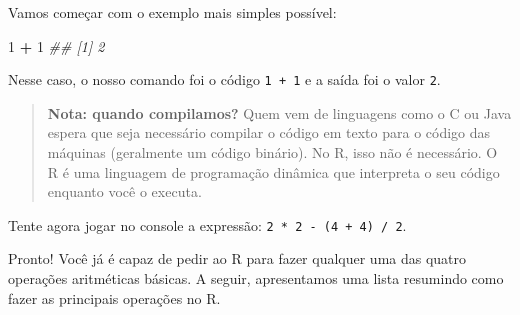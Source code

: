 \documentclass[]{book}
\newenvironment{Shaded}{\begin{snugshade}}{\end{snugshade}}
\newcommand{\CommentTok}[1]{\textcolor[rgb]{0.56,0.35,0.01}{\textit{#1}}}
\newcommand{\DecValTok}[1]{\textcolor[rgb]{0.00,0.00,0.81}{#1}}
\newcommand{\OperatorTok}[1]{\textcolor[rgb]{0.81,0.36,0.00}{\textbf{#1}}}
\newcommand{\StringTok}[1]{\textcolor[rgb]{0.31,0.60,0.02}{#1}}
\begin{document}
Vamos começar com o exemplo mais simples possível:

\begin{Shaded}
\begin{Highlighting}[]
\DecValTok{1} \OperatorTok{+}\StringTok{ }\DecValTok{1}
\CommentTok{## [1] 2}
\end{Highlighting}
\end{Shaded}

Nesse caso, o nosso comando foi o código \texttt{1\ +\ 1} e a saída foi o valor \texttt{2}.

\begin{quote}
\textbf{Nota: quando compilamos?} Quem vem de linguagens como o C ou Java espera que seja necessário compilar o código em texto para o código das máquinas (geralmente um código binário). No R, isso não é necessário. O R é uma linguagem de programação dinâmica que interpreta o seu código enquanto você o executa.
\end{quote}

Tente agora jogar no console a expressão: \texttt{2\ *\ 2\ -\ (4\ +\ 4)\ /\ 2}.

Pronto! Você já é capaz de pedir ao R para fazer qualquer uma das quatro operações aritméticas básicas. A seguir, apresentamos uma lista resumindo como fazer as principais operações no R.

\begin{Shaded}
\end{Shaded}
\end{document}
